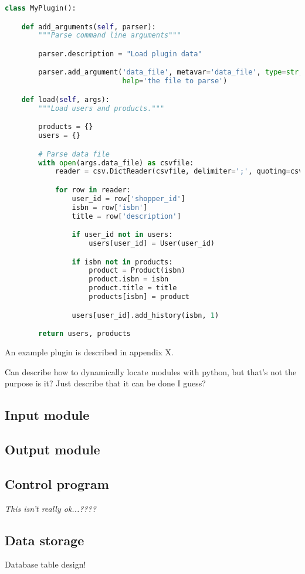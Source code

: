\begin{lstlisting}[language=python]
class MyPlugin():

    def add_arguments(self, parser):
        """Parse command line arguments"""

        parser.description = "Load plugin data"

        parser.add_argument('data_file', metavar='data_file', type=str,
                            help='the file to parse')

    def load(self, args):
        """Load users and products."""

        products = {}
        users = {}

        # Parse data file
        with open(args.data_file) as csvfile:
            reader = csv.DictReader(csvfile, delimiter=';', quoting=csv.QUOTE_NONE)

            for row in reader:
                user_id = row['shopper_id']
                isbn = row['isbn']
                title = row['description']

                if user_id not in users:
                    users[user_id] = User(user_id)

                if isbn not in products:
                    product = Product(isbn)
                    product.isbn = isbn
                    product.title = title
                    products[isbn] = product

                users[user_id].add_history(isbn, 1)

        return users, products
\end{lstlisting}

An example plugin is described in appendix X. 

Can describe how to dynamically locate modules with python, but that's not the purpose is it? Just describe that it can be done I guess?



\subsection{Input module}

\subsection{Output module}

\subsection{Control program}

\textit{This isn't really ok...????}

\subsection{Data storage}\label{sec:res:data}

Database table design!

